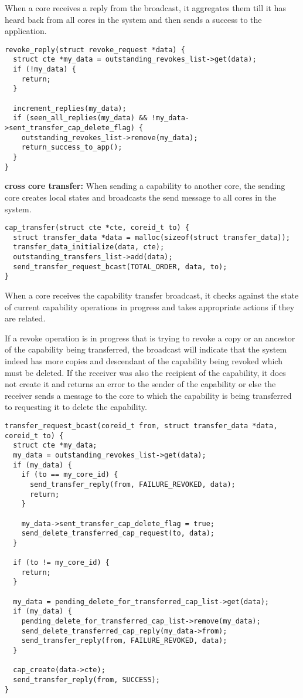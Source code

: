 \documentclass[a4paper,twoside]{report} %
\begin{document}
When a core receives a reply from the broadcast, it aggregates them
till it has heard back from all cores in the system and then sends a
success to the application.

\begin{verbatim}
revoke_reply(struct revoke_request *data) {
  struct cte *my_data = outstanding_revokes_list->get(data);
  if (!my_data) {
    return;
  }

  increment_replies(my_data);
  if (seen_all_replies(my_data) && !my_data->sent_transfer_cap_delete_flag) {
    outstanding_revokes_list->remove(my_data);
    return_success_to_app();
  }
}
\end{verbatim}

\textbf{cross core transfer:} When sending a capability to another
core, the sending core creates local states and broadcasts the send
message to all cores in the system.

\begin{verbatim}
cap_transfer(struct cte *cte, coreid_t to) {
  struct transfer_data *data = malloc(sizeof(struct transfer_data));
  transfer_data_initialize(data, cte);
  outstanding_transfers_list->add(data);
  send_transfer_request_bcast(TOTAL_ORDER, data, to);
}
\end{verbatim}

When a core receives the capability transfer broadcast, it checks
against the state of current capability operations in progress and
takes appropriate actions if they are related.

If a revoke operation is in progress that is trying to revoke a copy
or an ancestor of the capability being transferred, the broadcast will
indicate that the system indeed has more copies and descendant of the
capability being revoked which must be deleted. If the receiver was
also the recipient of the capability, it does not create it and
returns an error to the sender of the capability or else the receiver
sends a message to the core to which the capability is being
transferred to requesting it to delete the capability.

\begin{verbatim}
transfer_request_bcast(coreid_t from, struct transfer_data *data, coreid_t to) {
  struct cte *my_data;
  my_data = outstanding_revokes_list->get(data);
  if (my_data) {
    if (to == my_core_id) {
      send_transfer_reply(from, FAILURE_REVOKED, data);
      return;
    }

    my_data->sent_transfer_cap_delete_flag = true;
    send_delete_transferred_cap_request(to, data);
  }

  if (to != my_core_id) {
    return;
  }

  my_data = pending_delete_for_transferred_cap_list->get(data);
  if (my_data) {
    pending_delete_for_transferred_cap_list->remove(my_data);
    send_delete_transferred_cap_reply(my_data->from);
    send_transfer_reply(from, FAILURE_REVOKED, data);
  }

  cap_create(data->cte);
  send_transfer_reply(from, SUCCESS);
}
\end{verbatim}
\end{document}
